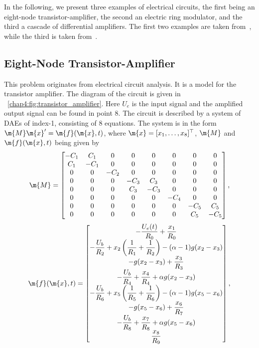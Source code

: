 In the following, we present three examples of electrical circuits, the first being an eight-node transistor-amplifier, the second an electric ring modulator, and the third a cascade of differential amplifiers. The first two examples are taken from~\cite{lioen1998test, mazzia2008test}, while the third is taken from~\cite{brenan1995numerical}.

\subsection{Eight-Node Transistor-Amplifier}

This problem originates from electrical circuit analysis. It is a model for the transistor amplifier. The diagram of the circuit is given in \figurename{}~\ref{chap4:fig:transistor_amplifier}. Here $U_e$ is the input signal and the amplified output signal can be found in point $8$. The circuit is described by a system of \acp{DAE} of index-1, consisting of 8 equations. The system is in the form $\m{M}\m{x}^\prime = \m{f}(\m{x},t)$, where $\m{x} = [x_1, \dots, x_8]^\top$, $\m{M}$ and $\m{f}(\m{x},t)$ being given by
%
\begin{equation}
  \m{M} = \begin{bmatrix}
    -C_1 & C_1 & 0 & 0 & 0 & 0 & 0 & 0 \\
    C_1 & -C_1 & 0 & 0 & 0 & 0 & 0 & 0 \\
    0 & 0 & -C_2 & 0 & 0 & 0 & 0 & 0 \\
    0 & 0 & 0 & -C_3 & C_3 & 0 & 0 & 0 \\
    0 & 0 & 0 & C_3 & -C_3 & 0 & 0 & 0 \\
    0 & 0 & 0 & 0 & 0 & -C_4 & 0 & 0 \\
    0 & 0 & 0 & 0 & 0 & 0 & -C_5 & C_5 \\
    0 & 0 & 0 & 0 & 0 & 0 & C_5 & -C_5
  \end{bmatrix} \text{,}
\end{equation}
%
\begin{equation}
  \m{f}(\m{x},t) = \begin{bmatrix}
    -\dfrac{U_e(t)}{R_0} + \dfrac{x_1}{R_0} \\
    -\dfrac{U_b}{R_2} + x_2\left(\dfrac{1}{R_1}+\dfrac{1}{R_2}\right) - (\alpha-1)g(x_2-x_3) \\
    -g(x_2-x_3)+\dfrac{x_3}{R_3} \\
    -\dfrac{U_b}{R_4} + \dfrac{x_4}{R_4} + \alpha g(x_2-x_3) \\
    -\dfrac{U_b}{R_6} + x_5\left(\dfrac{1}{R_5} + \dfrac{1}{R_6}\right)-(\alpha-1) g(x_5-x_6) \\
    -g(x_5-x_6) + \dfrac{x_6}{R_7} \\
    -\dfrac{U_b}{R_8} + \dfrac{x_7}{R_8} + \alpha g(x_5-x_6) \\
    \dfrac{x_8}{R_9}
  \end{bmatrix} \text{,}
\end{equation}
